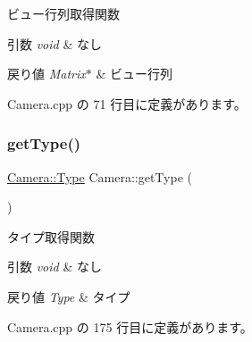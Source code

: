 ビュー行列取得関数 


\begin{DoxyParams}{引数}
{\em void} & なし \\
\hline
\end{DoxyParams}

\begin{DoxyRetVals}{戻り値}
{\em Matrix$\ast$} & ビュー行列 \\
\hline
\end{DoxyRetVals}


 Camera.\+cpp の 71 行目に定義があります。

\mbox{\label{class_camera_a65143452b51a6d5e1470f79a4c358679}} 
\subsubsection{\texorpdfstring{get\+Type()}{getType()}}
{\footnotesize\ttfamily \mbox{\hyperlink{class_camera_a3b0a1f58deca679ac665f61c480d1dcb}{Camera\+::\+Type}} Camera\+::get\+Type (\begin{DoxyParamCaption}{ }\end{DoxyParamCaption})}



タイプ取得関数 


\begin{DoxyParams}{引数}
{\em void} & なし \\
\hline
\end{DoxyParams}

\begin{DoxyRetVals}{戻り値}
{\em Type} & タイプ \\
\hline
\end{DoxyRetVals}


 Camera.\+cpp の 175 行目に定義があります。

\mbox{\label{class_camera_a7742a0dd5a97b1f4c9777a018feb8146}} 
